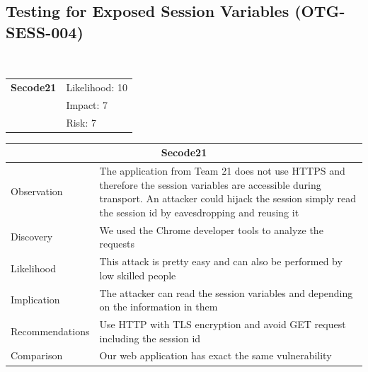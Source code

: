 \documentclass[headsepline,footsepline,footinclude=false,oneside,fontsize=11pt,paper=a4,listof=totoc,bibliography=totoc]{scrbook} %
\begin{document}
\subsection{Testing for Exposed Session Variables (OTG-SESS-004)}\

\begin{tabular}{cR{12cm}}
	\textbf{Secode21} & Likelihood: 10\\& Impact: 7\\& Risk: 7
\end{tabular}

\begin{tabular}{ l|p{11cm}  }
	\hline
	\multicolumn{2}{c}{\textbf{Secode21}} \\
	\hline
	Observation & The application from Team 21 does not use HTTPS and therefore the session variables
	are accessible during transport. An attacker could hijack the session simply read the session id by eavesdropping
	and reusing it \\
	Discovery & We used the Chrome developer tools to analyze the requests \\
	Likelihood & This attack is pretty easy and can also be performed by low skilled people\\
	Implication & The attacker can read the session variables and depending on the information in them  \\
	Recommendations & Use HTTP with TLS encryption and avoid GET request including the session id\\
	Comparison & Our web application has exact the same vulnerability\\
	\hline
\end{tabular}
\\
\vspace{0.5cm}
\\
\end{document}
